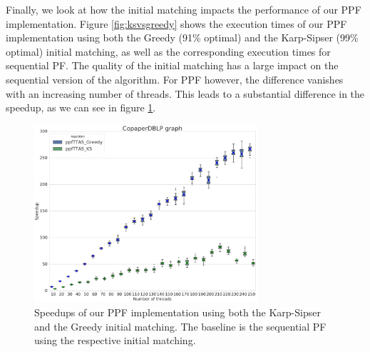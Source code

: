 \documentclass[letterpaper]{article}
\begin{document}
Finally, we look at how the initial matching impacts the performance of our PPF implementation. 
Figure \ref{fig:ksvsgreedy} shows the execution times of our PPF implementation using both the Greedy (91\% optimal) and the Karp-Sipser (99\% optimal) initial matching,
as well as the corresponding execution times for sequential PF. 
The quality of the initial matching has a large impact on the sequential version of the algorithm. 
For PPF however, the difference vanishes with an increasing number of threads. 
This leads to a substantial difference in the speedup, as we can see in figure \ref{fig:ksvsgreedy_s}. 

\begin{figure}
	\includegraphics[width=8.3cm]{../../plot/output/report/wikipedia_GREEDYvsKS.png}
	\caption{Speedups of our PPF implementation using both the Karp-Sipser and the Greedy initial matching. The baseline is the sequential PF using the respective initial matching.}
	\label{fig:ksvsgreedy_s}
\end{figure}

%

%
\end{document}
